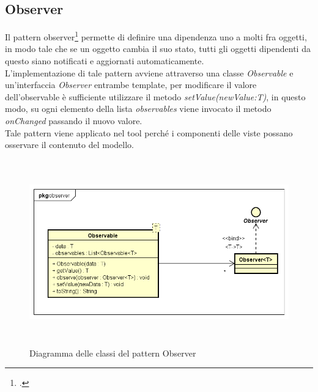 \subsection{Observer}\label{subsec:observer}
Il pattern observer\footcite{womak:observer} permette di definire una dipendenza uno a molti fra oggetti, in modo tale che se un oggetto cambia il suo stato, tutti gli oggetti dipendenti da questo siano notificati e aggiornati automaticamente.\\
L'implementazione di tale pattern avviene attraverso una classe \textit{Observable} e un'interfaccia \textit{Observer} entrambe template, per modificare il valore dell'observable è sufficiente utilizzare il metodo \textit{setValue(newValue:T)}, in questo modo, su ogni elemento della lista \textit{observables} viene invocato il metodo \textit{onChanged} passando il nuovo valore.\\
Tale pattern viene applicato nel tool perché i componenti delle viste possano osservare il contenuto del modello.
\begin{figure}[H]
    \centering
    \includegraphics[width=14cm, height=8cm]{./immagini/diagrammi_uml/Observer.png}
    \caption{Diagramma delle classi del pattern Observer}\label{fig:observer}
\end{figure}

\newpage
